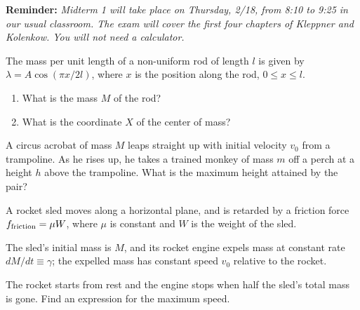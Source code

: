 \documentclass[12pt,letterpaper]{hmcpset}
\begin{document}


\textbf{Reminder:} \textsl{Midterm 1 will take place on Thursday, 2/18, from 8:10 to
9:25 in our usual classroom. The exam will cover the first four chapters of
Kleppner and Kolenkow. You will not need a calculator.}

\begin{problem}
    The mass per unit length of a non-uniform
    rod of length $l$ is given by $\lambda =
    A \cos(\pi x/2 l)$, where $x$ is the
    position along the rod, $0 \le x \le l$.

    \begin{enumerate}
    \item What is the mass $M$ of the rod?
    \item What is the coordinate $X$ of the center of mass?
    \end{enumerate}
\end{problem}
\begin{solution}
    \vfill
\end{solution}

\clearpage


\begin{problem}
  A circus acrobat of mass $M$ leaps
  straight up with initial velocity $v_{0}$
  from a trampoline. As he rises up, he
  takes a trained monkey of mass $m$ off a
  perch at a height $h$ above the trampoline.
  What is the maximum height attained by the pair?
\end{problem}
\begin{solution}
    \vfill
\end{solution}

\clearpage


\begin{problem}
  A rocket sled moves along a horizontal plane, and is retarded by a friction
  force $f_{\rm friction} = \mu W$, where $\mu$ is constant and $W$ is the
  weight of the sled.

  The sled's initial mass is $M$, and its rocket engine expels mass at constant
  rate $dM/dt \equiv \gamma$; the expelled mass has constant speed $v_{0}$
  relative to the rocket.

  The rocket starts from rest and the engine stops when half the sled's total
  mass is gone. Find an expression for the maximum speed.
\end{problem}
\begin{solution}
    \vfill
\end{solution}
\end{document}
